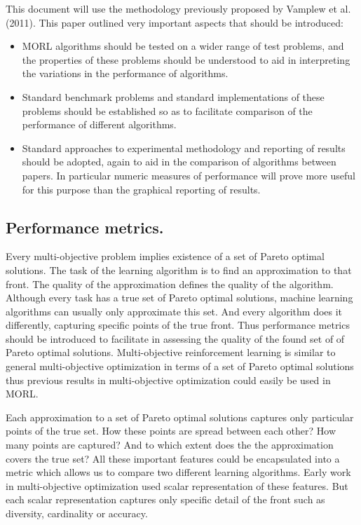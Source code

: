 This document will use the methodology previously proposed by Vamplew et al. (2011)\nocite{vamplew2011empirical}. This paper outlined very important aspects that should be introduced:
\begin{itemize}
  \item MORL algorithms should be tested on a wider range of test problems, and the properties of these problems should be understood to aid in interpreting the variations in the performance of algorithms.
  \item Standard benchmark problems and standard implementations of these problems should be established so as to facilitate comparison of the performance of different algorithms.
  \item Standard approaches to experimental methodology and reporting of results should be adopted, again to aid in the comparison of algorithms between papers. In particular numeric measures of performance will prove more useful for this purpose than the graphical reporting of results.
\end{itemize}

\subsection{Performance metrics.}

Every multi-objective problem implies existence of a set of Pareto optimal solutions. The task of the learning algorithm is to find an approximation to that front. The quality of the approximation defines the quality of the algorithm. Although every task has a true set of Pareto optimal solutions, machine learning algorithms can usually only approximate this set. And every algorithm does it differently, capturing specific points of the true front. Thus performance metrics should be introduced to facilitate in assessing the quality of the found set of of Pareto optimal solutions.  Multi-objective reinforcement learning is similar to general multi-objective optimization in terms of a set of Pareto optimal solutions thus previous results in multi-objective optimization could easily be used in MORL.

Each approximation to a set of Pareto optimal solutions captures only particular points of the true set. How these points are spread between each other? How many points are captured? And to which extent does the the approximation covers the true set? All these important features could be encapsulated into a metric which allows us to compare two different learning algorithms. Early work in multi-objective optimization used scalar representation of these features. But each scalar representation captures only specific detail of the front such as diversity, cardinality or accuracy.

